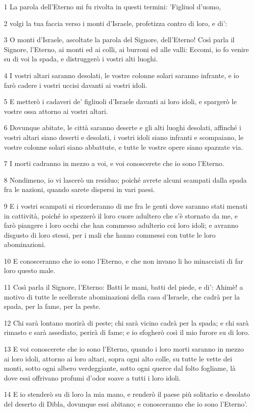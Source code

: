 \par 1 La parola dell'Eterno mi fu rivolta in questi termini: 'Figliuol d'uomo,
\par 2 volgi la tua faccia verso i monti d'Israele, profetizza contro di loro, e di':
\par 3 O monti d'Israele, ascoltate la parola del Signore, dell'Eterno! Così parla il Signore, l'Eterno, ai monti ed ai colli, ai burroni ed alle valli: Eccomi, io fo venire su di voi la spada, e distruggerò i vostri alti luoghi.
\par 4 I vostri altari saranno desolati, le vostre colonne solari saranno infrante, e io farò cadere i vostri uccisi davanti ai vostri idoli.
\par 5 E metterò i cadaveri de' figliuoli d'Israele davanti ai loro idoli, e spargerò le vostre ossa attorno ai vostri altari.
\par 6 Dovunque abitate, le città saranno deserte e gli alti luoghi desolati, affinché i vostri altari siano deserti e desolati, i vostri idoli siano infranti e scompaiano, le vostre colonne solari siano abbattute, e tutte le vostre opere siano spazzate via.
\par 7 I morti cadranno in mezzo a voi, e voi conoscerete che io sono l'Eterno.
\par 8 Nondimeno, io vi lascerò un residuo; poiché avrete alcuni scampati dalla spada fra le nazioni, quando sarete dispersi in vari paesi.
\par 9 E i vostri scampati si ricorderanno di me fra le genti dove saranno stati menati in cattività, poiché io spezzerò il loro cuore adultero che s'è stornato da me, e farò piangere i loro occhi che han commesso adulterio coi loro idoli; e avranno disgusto di loro stessi, per i mali che hanno commessi con tutte le loro abominazioni.
\par 10 E conosceranno che io sono l'Eterno, e che non invano li ho minacciati di far loro questo male.
\par 11 Così parla il Signore, l'Eterno: Batti le mani, batti del piede, e di': Ahimè! a motivo di tutte le scellerate abominazioni della casa d'Israele, che cadrà per la spada, per la fame, per la peste.
\par 12 Chi sarà lontano morirà di peste; chi sarà vicino cadrà per la spada; e chi sarà rimasto e sarà assediato, perirà di fame; e io sfogherò così il mio furore su di loro.
\par 13 E voi conoscerete che io sono l'Eterno, quando i loro morti saranno in mezzo ai loro idoli, attorno ai loro altari, sopra ogni alto colle, su tutte le vette dei monti, sotto ogni albero verdeggiante, sotto ogni querce dal folto fogliame, là dove essi offrivano profumi d'odor soave a tutti i loro idoli.
\par 14 E io stenderò su di loro la mia mano, e renderò il paese più solitario e desolato del deserto di Dibla, dovunque essi abitano; e conosceranno che io sono l'Eterno'.

